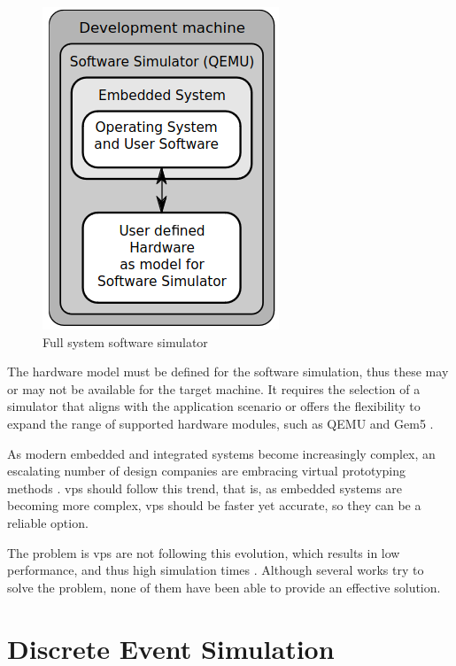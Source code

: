 \begin{figure}[H]
	\centering
 	\includegraphics[width=0.3\linewidth]{Images/FSSsoftware.png}
 	\caption{Full system software simulator \cite{TypesOfFSS}}
	 \label{fig_FSSsoftware}
\end{figure}

The hardware model must be defined for the software simulation, thus these may or may not be available for the target machine. It 
requires the selection of a simulator that aligns with the application scenario or offers the flexibility to expand the range of supported hardware 
modules, such as QEMU \cite{theQEMUsimulator} and Gem5 \cite{TheGem5Simulator}.

As modern embedded and integrated systems become increasingly complex, an escalating number of design companies are embracing virtual prototyping 
methods \cite{UltraFastVPs}. \Glspl{vp} should follow this trend, that is, as embedded systems are becoming more complex, \glspl{vp} should be 
faster yet accurate, so they can be a reliable option.

The problem is \glspl{vp} are not following this evolution, which results in low performance, and thus high simulation times \cite{pargem5} 
\cite{UltraFastVPs} \cite{optimizingTD}. Although several works try to solve the problem, none of them have been able to 
provide an effective solution.

 

\section{Discrete Event Simulation}



